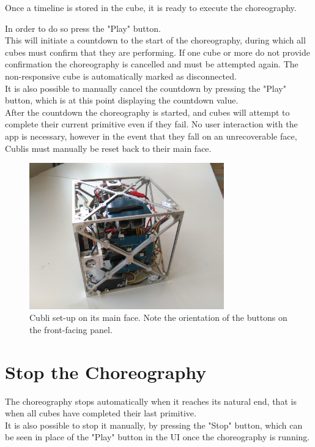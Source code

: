 Once a timeline is stored in the cube, it is ready to execute the choreography. 

In order to do so press the "Play" button.\\

This will initiate a countdown to the start of the choreography, during which all cubes must confirm that they are performing. If one cube or more do not provide confirmation the choreography is cancelled and must be attempted again. The non-responsive cube is automatically marked as disconnected.\\

It is also possible to manually cancel the countdown by pressing the "Play" button, which is at this point displaying the countdown value.\\

After the countdown the choreography is started, and cubes will attempt to complete their current primitive even if they fail. No user interaction with the app is necessary, however in the event that they fall on an unrecoverable face, Cublis must manually be reset back to their main face.

\begin{figure}[ht]
   \centering
   \includegraphics[width=0.75\textwidth]{img/MainFace.jpg}
   \caption{Cubli set-up on its main face. Note the orientation of the buttons on the front-facing panel.}
   \label{img:MainFace}
\end{figure}


\section{Stop the Choreography}

The choreography stops automatically when it reaches its natural end, that is when all cubes have completed their last primitive. \\

It is also possible to stop it manually, by pressing the "Stop" button, which can be seen in place of the "Play" button in the UI once the choreography is running.

